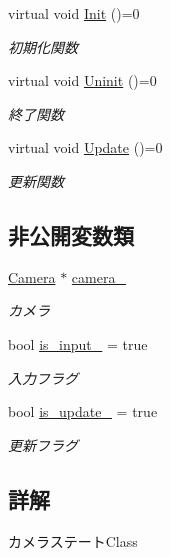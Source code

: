 \begin{DoxyCompactItemize}
virtual void \mbox{\hyperlink{class_camera_1_1_state_a11627f91e7dc5085d3cbb8841747a778}{Init}} ()=0
\begin{DoxyCompactList}\small\item\em 初期化関数 \end{DoxyCompactList}\item 
virtual void \mbox{\hyperlink{class_camera_1_1_state_adb3f43b6c3f8100da7877867180e804b}{Uninit}} ()=0
\begin{DoxyCompactList}\small\item\em 終了関数 \end{DoxyCompactList}\item 
virtual void \mbox{\hyperlink{class_camera_1_1_state_ab94ec2ba6c56d974cf9e0d7d232948cf}{Update}} ()=0
\begin{DoxyCompactList}\small\item\em 更新関数 \end{DoxyCompactList}\end{DoxyCompactItemize}
\subsection*{非公開変数類}
\begin{DoxyCompactItemize}
\item 
\mbox{\hyperlink{class_camera}{Camera}} $\ast$ \mbox{\hyperlink{class_camera_1_1_state_a2e5655fdfb42bda75fe742e759c7001a}{camera\+\_\+}}
\begin{DoxyCompactList}\small\item\em カメラ \end{DoxyCompactList}\item 
bool \mbox{\hyperlink{class_camera_1_1_state_a4cdcb987af52635b6d6c81559ab03ba6}{is\+\_\+input\+\_\+}} = true
\begin{DoxyCompactList}\small\item\em 入力フラグ \end{DoxyCompactList}\item 
bool \mbox{\hyperlink{class_camera_1_1_state_aa54c42af6127f83f00845788e32e575a}{is\+\_\+update\+\_\+}} = true
\begin{DoxyCompactList}\small\item\em 更新フラグ \end{DoxyCompactList}\end{DoxyCompactItemize}


\subsection{詳解}
カメラステート\+Class 

